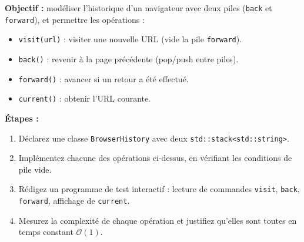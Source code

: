 \begin{tp}
\textbf{Objectif :} modéliser l’historique d’un navigateur avec deux piles
(\lstinline|back| et \lstinline|forward|), et permettre les opérations :
\begin{itemize}
  \item \lstinline|visit(url)| : visiter une nouvelle URL (vide la pile \lstinline|forward|).
  \item \lstinline|back()| : revenir à la page précédente (pop/push entre piles).
  \item \lstinline|forward()| : avancer si un retour a été effectué.
  \item \lstinline|current()| : obtenir l’URL courante.
\end{itemize}
\textbf{Étapes :}
\begin{enumerate}
  \item Déclarez une classe \lstinline|BrowserHistory| avec deux
        \lstinline|std::stack<std::string>|.
  \item Implémentez chacune des opérations ci-dessus, en vérifiant les
        conditions de pile vide.
  \item Rédigez un programme de test interactif : lecture de commandes
        \lstinline|visit|, \lstinline|back|, \lstinline|forward|,
        affichage de \lstinline|current|.
  \item Mesurez la complexité de chaque opération et justifiez qu’elles sont
        toutes en temps constant \(\mathcal{O}(1)\).
\end{enumerate}
\end{tp}


